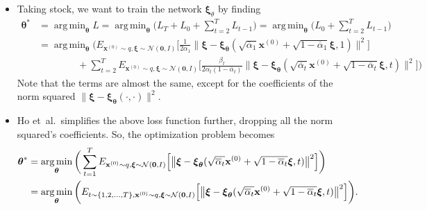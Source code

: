 \documentclass[10pt]{article}
\newcommand{\ve}[1]{\mathbf{#1}}
\newcommand{\ves}[1]{\boldsymbol{#1}}
\newcommand{\etal}{{et~al.}}
\newcommand{\mcal}[1]{\mathcal{#1}}
\DeclareMathOperator*{\argmin}{arg\,min}
\begin{document}
\begin{itemize}
  \item Taking stock, we want to train the network $\ves{\xi}_{\theta}$ by finding
  \begin{align*}
    \ves{\theta}^* 
    &= \argmin_{\ves{\theta}} L 
    = \argmin_{\ves{\theta}} \bigg( L_T + L_0 + \sum_{t=2}^{T} L_{t-1} \bigg) 
    = \argmin_{\ves{\theta}} \bigg( L_0 + \sum_{t=2}^{T} L_{t-1} \bigg) \\
    &= \argmin_{\ves{\theta}} \bigg( E_{\ve{x}^{(0)} \sim q, \ves{\xi} \sim \mcal{N}(\ve{0}, I)} \bigg[ \frac{1}{2\alpha_1} \Big\| \ves{\xi} - \ves{\xi}_{\ves{\theta}}(\sqrt{\overline{\alpha}_1}\ve{x}^{(0)} + \sqrt{1 - \overline{\alpha}_1} \ves{\xi}, 1 ) \Big\|^2 \bigg] \\
    &\qquad \qquad + \sum_{t=2}^{T} E_{\ve{x}^{(0)} \sim q, \ves{\xi} \sim \mcal{N}(\ve{0}, I)} \bigg[ \frac{\beta_t}{2 \alpha_t (1 - \overline{\alpha}_t)} \big\| \ves{\xi} - \ves{\xi}_{\ves{\theta}}(\sqrt{\overline{\alpha}_t}\ve{x}^{(0)} + \sqrt{1 - \overline{\alpha}_t}\ves{\xi},t) \big\|^2  \bigg] \bigg)
  \end{align*}
  Note that the terms are almost the same, except for the coefficients of the norm squared $\| \ves{\xi} - \ves{\xi}_{\ves{\theta}}(\cdot, \cdot) \|^2$.

  \item Ho \etal\ simplifies the above loss function further, dropping all the norm squared's coefficients. So, the optimization problem becomes
  \begin{align}
    \ves{\theta}^* 
    &= \argmin_{\ves{\theta}} \bigg( \sum_{t=1}^T E_{\ve{x}^{(0)} \sim q, \ves{\xi} \sim \mcal{N}(\ve{0}, I)} \Big[ \big\| \ves{\xi} - \ves{\xi}_{\ves{\theta}}(\sqrt{\overline{\alpha}_t}\ve{x}^{(0)} + \sqrt{1 - \overline{\alpha}_t}\ves{\xi}, t) \big\|^2 \Big] \bigg) \notag \\
    &= \argmin_{\ves{\theta}} \bigg( E_{t \sim \{ 1, 2, \dotsc, T \}, \ve{x}^{(0)} \sim q, \ves{\xi} \sim \mcal{N}(\ve{0}, I)} \Big[ \big\| \ves{\xi} - \ves{\xi}_{\ves{\theta}}(\sqrt{\overline{\alpha}_t}\ve{x}^{(0)} + \sqrt{1 - \overline{\alpha}_t}\ves{\xi}, t) \big\|^2 \Big] \bigg). \label{ddpm-noise-optimization}
  \end{align}


\end{itemize}
\end{document}
